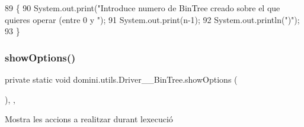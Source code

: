 \begin{DoxyCode}
89                                                   \{
90         System.out.print(\textcolor{stringliteral}{"Introduce numero de BinTree creado sobre el que quieres operar (entre 0 y "});
91         System.out.print(n-1);
92         System.out.println(\textcolor{stringliteral}{")"});
93     \}
\end{DoxyCode}
\mbox{\label{classdomini_1_1utils_1_1Driver____BinTree_aadd7535430d353033b6f35b6d466e018}} 
\subsubsection{\texorpdfstring{show\+Options()}{showOptions()}}
{\footnotesize\ttfamily private static void domini.\+utils.\+Driver\+\_\+\+\_\+\+Bin\+Tree.\+show\+Options (\begin{DoxyParamCaption}{ }\end{DoxyParamCaption})\hspace{0.3cm}{\ttfamily [inline]}, {\ttfamily [static]}, {\ttfamily [private]}}



Mostra les accions a realitzar durant l\textquotesingle{}execució 


